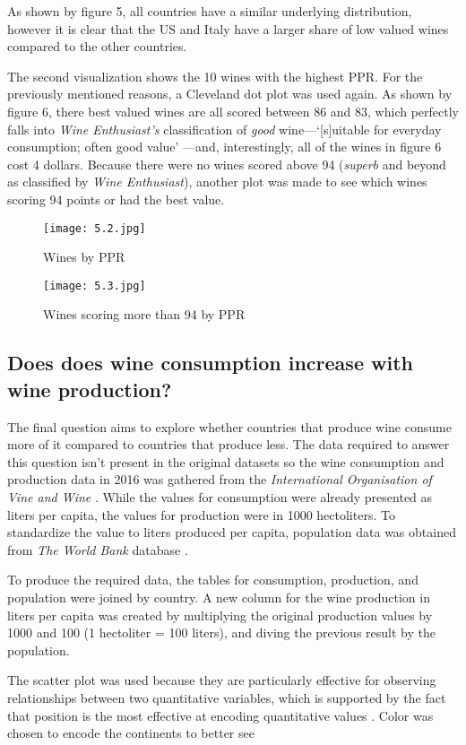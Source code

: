 As shown by figure 5, all countries have a similar underlying distribution, however it is clear that the US and Italy have a larger share of low valued wines compared to the other countries.

The second visualization shows the 10 wines with the highest PPR. For the previously mentioned reasons, a Cleveland dot plot was used again. As shown by figure 6, there best valued wines are all scored between 86 and 83, which perfectly falls into \emph{Wine Enthusiast's} classification of \emph{good} wine---`[s]uitable for everyday consumption; often good value' \cite{WineMag}---and, interestingly, all of the wines in figure 6 cost 4 dollars. Because there were no wines scored above 94 (\emph{superb} and beyond as classified by \emph{Wine Enthusiast}), another plot was made to see which wines scoring 94 points or had the best value.

\begin{figure}[h]
  \texttt{[image: 5.2.jpg]}
  \caption{Wines by PPR}
\end{figure}

\begin{figure}[h]
  \texttt{[image: 5.3.jpg]}
  \caption{Wines scoring more than 94 by PPR}
\end{figure}

\subsection{Does does wine consumption increase with wine production?}

The final question aims to explore whether countries that produce wine consume more of it compared to countries that produce less. The data required to answer this question isn't present in the original datasets so the wine consumption and production data in 2016 was gathered from the \emph{International Organisation of Vine and Wine} \cite{OIV}. While the values for consumption were already presented as liters per capita, the values for production were in 1000 hectoliters. To standardize the value to liters produced per capita, population data was obtained from \emph{The World Bank} database \cite{WorldBank}.

To produce the required data, the tables for consumption, production, and population were joined by country. A new column for the wine production in liters per capita was created by multiplying the original production values by 1000 and 100 (1 hectoliter = 100 liters), and diving the previous result by the population.

The scatter plot was used because they are particularly effective for observing relationships between two quantitative variables, which is supported by the fact that position is the most effective at encoding quantitative values \cite{Mackinlay}. Color was chosen to encode the continents to better see 




    
